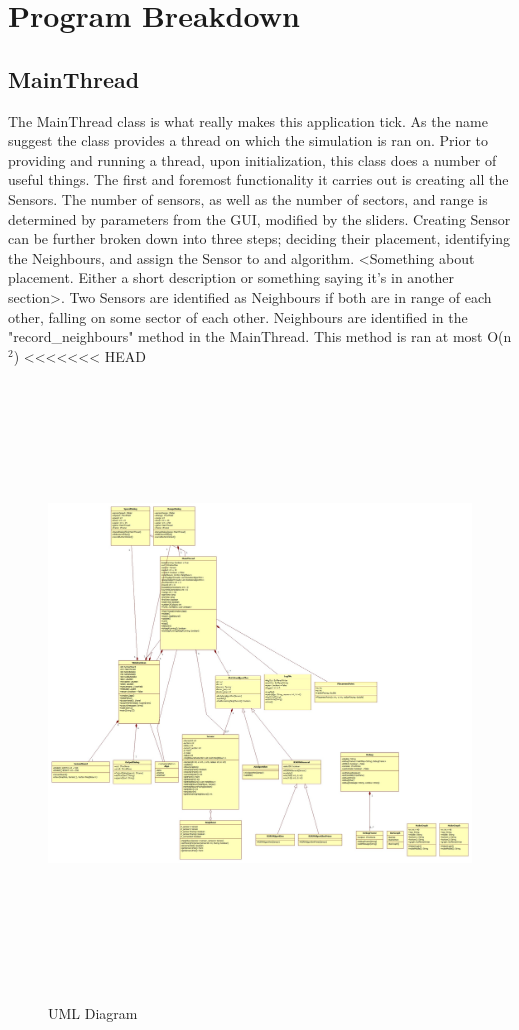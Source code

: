 \section{Program Breakdown}

\subsection{MainThread}

The MainThread class is what really makes this application tick. As the name
suggest the class provides a thread on which the simulation is ran on. Prior to providing and running a thread, upon initialization, this class does a number of useful things. The first and foremost functionality it carries out is creating all
the Sensors. The number of sensors, as well as the number of sectors, and range is determined by parameters from the GUI, modified by the sliders. Creating Sensor
can be further broken down into three steps; deciding their placement, identifying the Neighbours, and assign the Sensor to and algorithm. <Something about
placement. Either a short description or something saying it's in another
section>.  Two Sensors are identified as Neighbours if both are in range of each other, falling on some sector of each other. Neighbours are identified in the
"record\_neighbours" method in the MainThread. This method is ran at most 
O(n$^{2}$)
<<<<<<< HEAD

\begin{figure}
\caption{UML Diagram}
\includegraphics[height = 16cm]{pics/Main.jpg}\\[0.5cm]    
\end{figure}

